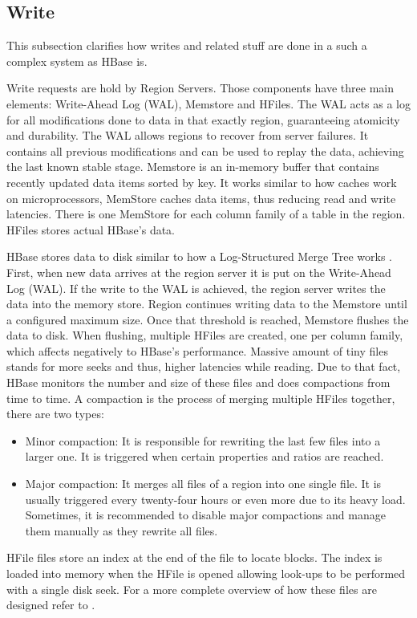\subsection {Write}
This subsection clarifies how writes and related stuff are done in a such a complex system as HBase is.
\par
Write requests are hold by Region Servers. Those components have three main elements: Write-Ahead Log (WAL), Memstore and HFiles. The WAL acts as a log for all modifications done to data in that exactly region, guaranteeing atomicity and durability. The WAL allows regions to recover from server failures. It contains all previous modifications and can be used to replay the data, achieving the last known stable stage. Memstore is an in-memory buffer that contains recently updated data items sorted by key. It works similar to how caches work on microprocessors, MemStore caches data items, thus reducing read and write latencies. There is one MemStore for each column family of a table in the region. HFiles stores actual HBase's data.
\par
HBase stores data to disk similar to how a Log-Structured Merge Tree works \cite{o1996log}. First, when new data arrives at the region server it is put on the Write-Ahead Log (WAL). If the write to the WAL is achieved, the region server writes the data into the memory store. Region continues writing data to the Memstore until a configured maximum size. Once that threshold is reached, Memstore flushes the data to disk. When flushing, multiple HFiles are created, one per column family, which affects negatively to HBase's performance. Massive amount of tiny files stands for more seeks and thus, higher latencies while reading. Due to that fact, HBase monitors the number and size of these files and does compactions from time to time. A compaction is the process of merging multiple HFiles together, there are two types:
\begin{itemize}
\item Minor compaction: It is responsible for rewriting the last few files into a larger one. It is triggered when certain properties and ratios are reached.
\item Major compaction: It merges all files of a region into one single file. It is usually triggered every twenty-four hours or even more due to its heavy load. Sometimes, it is recommended to disable major compactions and manage them manually as they rewrite all files.
\end{itemize}

HFile files store an index at the end of the file to locate blocks. The index is loaded into memory when the HFile is opened allowing look-ups to be performed with a single disk seek. For a more complete overview of how these files are designed refer to \cite{white2012hadoop}.

